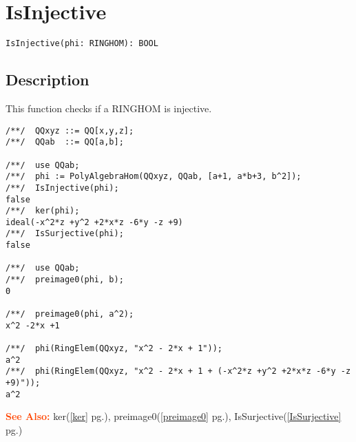 \documentclass[a4paper]{mybook}
\newenvironment{command}{}{} %
\newcommand\SeeAlso{\par\textcolor{OrangeRed}{\textbf{\large See Also: }}}
\begin{document}
\section{IsInjective}
\label{IsInjective}
\begin{command} %


\begin{Verbatim}[label=syntax, rulecolor=\color{MidnightBlue},
frame=single]
IsInjective(phi: RINGHOM): BOOL
\end{Verbatim}


\subsection*{Description}

This function checks if a RINGHOM is injective.
\begin{Verbatim}[label=example, rulecolor=\color{PineGreen}, frame=single]
/**/  QQxyz ::= QQ[x,y,z];
/**/  QQab  ::= QQ[a,b];

/**/  use QQab;
/**/  phi := PolyAlgebraHom(QQxyz, QQab, [a+1, a*b+3, b^2]);
/**/  IsInjective(phi);
false
/**/  ker(phi);
ideal(-x^2*z +y^2 +2*x*z -6*y -z +9)
/**/  IsSurjective(phi);
false

/**/  use QQab;
/**/  preimage0(phi, b);
0

/**/  preimage0(phi, a^2);
x^2 -2*x +1

/**/  phi(RingElem(QQxyz, "x^2 - 2*x + 1"));
a^2
/**/  phi(RingElem(QQxyz, "x^2 - 2*x + 1 + (-x^2*z +y^2 +2*x*z -6*y -z +9)"));
a^2
\end{Verbatim}


\SeeAlso %
  ker(\ref{ker} pg.\pageref{ker}), 
    preimage0(\ref{preimage0} pg.\pageref{preimage0}), 
    IsSurjective(\ref{IsSurjective} pg.\pageref{IsSurjective})
\end{command} %
\end{document}

